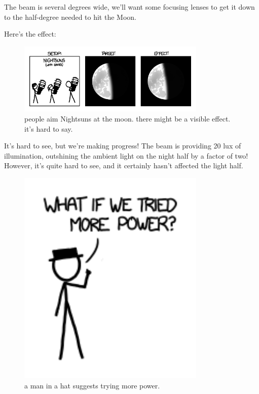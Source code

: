 {The beam is several degrees wide, we’ll want some focusing lenses to get it down to the half-degree needed to hit the Moon.}

{Here’s the effect:}

\begin{figure}[!htbp]
\centering
\includegraphics[scale=0.5, max width=0.8\textwidth]{imgs/a/13/laser_pointer_nightsun.png}
\caption{people aim Nightsuns at the moon. there might be a visible effect. it's hard to say.}
\end{figure}

{It’s hard to see, but we’re making progress! The beam is providing 20 lux of illumination, outshining the ambient light on the night half by a factor of two! However, it’s quite hard to see, and it certainly hasn’t affected the light half.}

\begin{figure}[!htbp]
\centering
\includegraphics[scale=0.5, max width=0.8\textwidth]{imgs/a/13/laser_pointer_more_power.png}
\caption{a man in a hat suggests trying more power.}
\end{figure}

